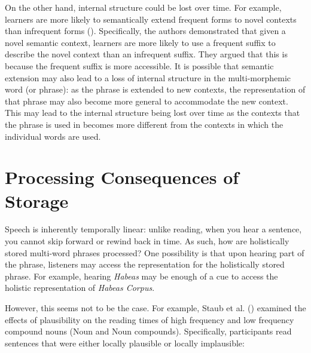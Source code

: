 \documentclass[
  12pt,
  letterpaper,
]{scrreprt}
\begin{document}
On the other hand, internal structure could be lost over time. For
example, learners are more likely to semantically extend frequent forms
to novel contexts than infrequent forms
().
Specifically, the authors demonstrated that given a novel semantic
context, learners are more likely to use a frequent suffix to describe
the novel context than an infrequent suffix. They argued that this is
because the frequent suffix is more accessible. It is possible that
semantic extension may also lead to a loss of internal structure in the
multi-morphemic word (or phrase): as the phrase is extended to new
contexts, the representation of that phrase may also become more general
to accommodate the new context. This may lead to the internal structure
being lost over time as the contexts that the phrase is used in becomes
more different from the contexts in which the individual words are used.

\section{Processing Consequences of
Storage}\label{sec-processing-consequences-of-storage}

Speech is inherently temporally linear: unlike reading, when you hear a
sentence, you cannot skip forward or rewind back in time. As such, how
are holistically stored multi-word phrases processed? One possibility is
that upon hearing part of the phrase, listeners may access the
representation for the holistically stored phrase. For example, hearing
\emph{Habeas} may be enough of a cue to access the holistic
representation of \emph{Habeas Corpus}.

However, this seems not to be the case. For example, Staub et al.
() examined the
effects of plausibility on the reading times of high frequency and low
frequency compound nouns (Noun and Noun compounds). Specifically,
participants read sentences that were either locally plausible or
locally implausible:
\end{document}
